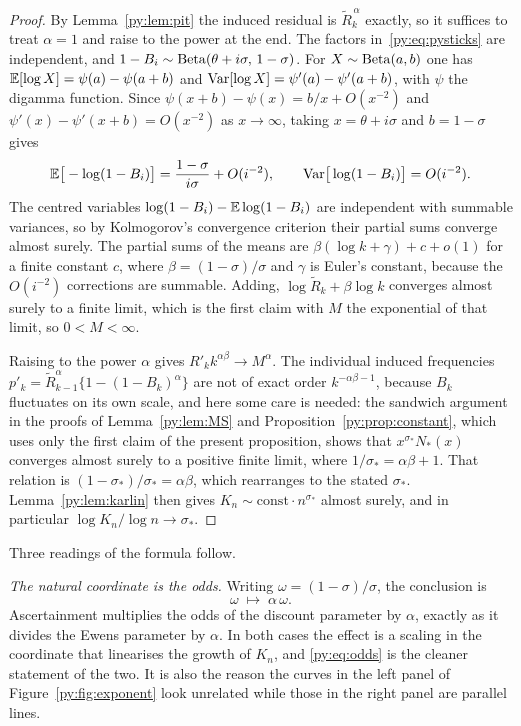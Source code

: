 \begin{proof}
By Lemma~\ref{py:lem:pit} the induced residual is $\widetilde R_k^{\,\alpha}$ exactly, so it suffices
to treat $\alpha = 1$ and raise to the power at the end. The factors in~\eqref{py:eq:pysticks} are
independent, and $1-B_i \sim \mathrm{Beta}(\theta+i\sigma,\,1-\sigma)$. For $X \sim \mathrm{Beta}(a,b)$ one has
$\mathbb{E}[\log X] = \psi(a)-\psi(a+b)$ and $\mathrm{Var}[\log X] = \psi'(a)-\psi'(a+b)$, with $\psi$ the digamma
function. Since $\psi(x+b)-\psi(x) = b/x + O(x^{-2})$ and $\psi'(x) - \psi'(x+b) = O(x^{-2})$ as
$x \to \infty$, taking $x = \theta+i\sigma$ and $b = 1-\sigma$ gives
\[
\mathbb{E}\big[-\log(1-B_i)\big] = \frac{1-\sigma}{i\sigma} + O(i^{-2}),
\qquad
\mathrm{Var}\big[\log(1-B_i)\big] = O(i^{-2}).
\]
The centred variables $\log(1-B_i)-\mathbb{E}\log(1-B_i)$ are independent with summable variances, so by
Kolmogorov's convergence criterion their partial sums converge almost surely. The partial sums of
the means are $\beta(\log k + \gamma) + c + o(1)$ for a finite constant $c$, where
$\beta = (1-\sigma)/\sigma$ and $\gamma$ is Euler's constant, because the $O(i^{-2})$ corrections are
summable. Adding, $\log\widetilde R_k + \beta\log k$ converges almost surely to a finite limit,
which is the first claim with $M$ the exponential of that limit, so $0 < M < \infty$.

Raising to the power $\alpha$ gives $R'_k k^{\alpha\beta} \to M^{\alpha}$. The individual induced
frequencies $p'_k = \widetilde R_{k-1}^{\alpha}\{1-(1-B_k)^{\alpha}\}$ are not of exact order
$k^{-\alpha\beta-1}$, because $B_k$ fluctuates on its own scale, and here some care is needed: the
sandwich argument in the proofs of Lemma~\ref{py:lem:MS} and Proposition~\ref{py:prop:constant},
which uses only the first claim of the present proposition, shows that $x^{\sigma_*}N_*(x)$
converges almost surely to a positive finite limit, where $1/\sigma_* = \alpha\beta+1$. That
relation is $(1-\sigma_*)/\sigma_* = \alpha\beta$, which rearranges to the stated $\sigma_*$.
Lemma~\ref{py:lem:karlin} then gives $K_n \sim \text{const}\cdot n^{\sigma_*}$ almost surely, and in
particular $\log K_n/\log n \to \sigma_*$.
\end{proof}

Three readings of the formula follow.

\emph{The natural coordinate is the odds.} Writing $\omega = (1-\sigma)/\sigma$, the conclusion is
\begin{equation}
\omega \;\longmapsto\; \alpha\,\omega .
\label{py:eq:odds}
\end{equation}
Ascertainment multiplies the odds of the discount parameter by $\alpha$, exactly as it divides the
Ewens parameter by $\alpha$. In both cases the effect is a scaling in the coordinate that
linearises the growth of $K_n$, and \eqref{py:eq:odds} is the cleaner statement of the two. It is
also the reason the curves in the left panel of Figure~\ref{py:fig:exponent} look unrelated while
those in the right panel are parallel lines.

